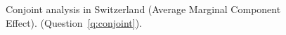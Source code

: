 \begin{figure}[h!]
    \caption[Conjoint analysis in Switzerland]{Conjoint analysis in Switzerland (Average Marginal Component Effect). \hfill (Question~\ref{q:conjoint}).
    }\label{fig:conjoint_CH}
\end{figure} 


